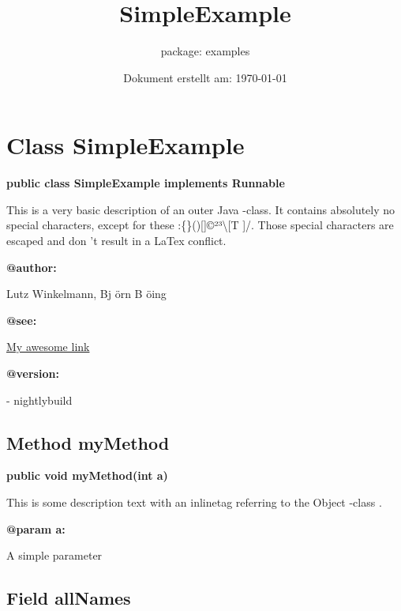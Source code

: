 \documentclass[12pt]{scrreprt}
\title{SimpleExample}
\subtitle{package: examples}
\date{Dokument erstellt am: \today}
\begin{document}

\maketitle
\newpage


\tableofcontents
\newpage

\setcounter{page}{0}


\chapter{Class SimpleExample}
\label{examples.SimpleExample}




\textbf{public class SimpleExample implements Runnable}


This is a very basic description of an outer Java -class. It contains absolutely no special characters, except for these :\{\}()[]©²³\textbackslash[T ]/. Those special characters are escaped and don 't result in a LaTex conflict.


\textbf{@author:}

\quad\quad Lutz Winkelmann, Bj örn B öing

\textbf{@see:}

\quad\quad \hyperref[examples.SimpleExample.My22Class:getx]{\color{tagLink}My awesome link}

\textbf{@version:}

\quad{}- nightlybuild


\section{Method myMethod}
\label{examples.SimpleExample:myMethod}




\textbf{public void myMethod(int a)}


This is some description text with an inlinetag referring to the Object -class \hyperref[Object]{\textbf{\color{inlineTagLink}}}.



\textbf{@param a:}

\quad\quad A simple parameter



\section{Field allNames}
\label{examples.SimpleExample:allNames}
\end{document}
